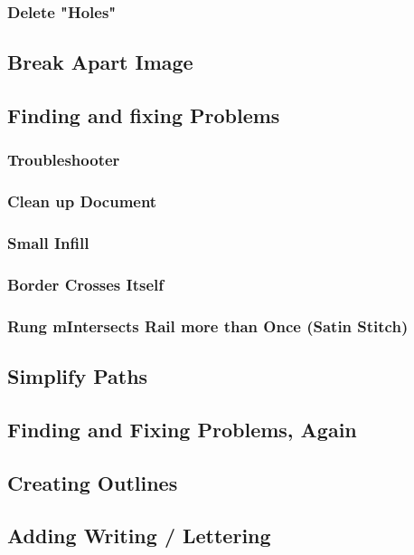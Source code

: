 \documentclass{article}
\begin{document}
        \subsubsection{Delete "Holes"}        
        
        \subsection{Break Apart Image}

        \subsection{Finding and fixing Problems}
            \subsubsection{Troubleshooter}
            \subsubsection{Clean up Document}
            \subsubsection{Small Infill}
            \subsubsection{Border Crosses Itself}
            \subsubsection{Rung mIntersects Rail more than Once (Satin Stitch)}

        \subsection{Simplify Paths}
        
        \subsection{Finding and Fixing Problems, Again}

        \subsection{Creating Outlines}
        
        \subsection{Adding Writing / Lettering}
\end{document}
